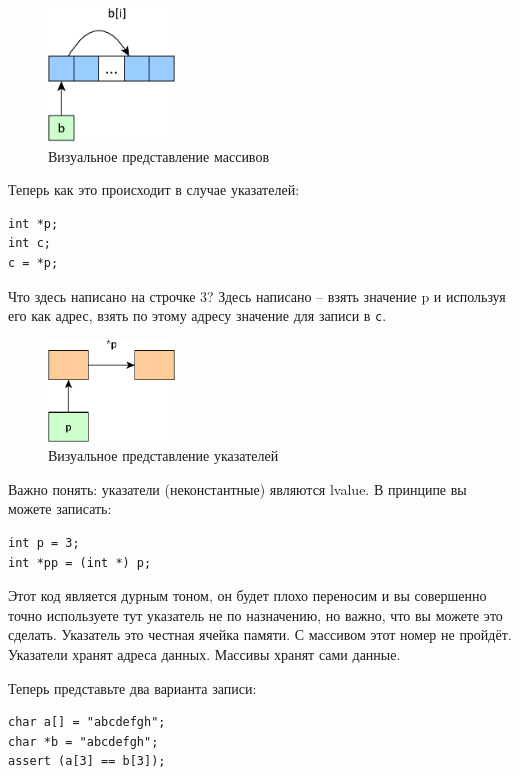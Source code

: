 \documentclass[a4paper,12pt,oneside]{article}
\begin{document}
\begin{figure}[h!]
\centering
\includegraphics[width=0.3\textwidth]{illustrations/arrays-crop.pdf}
\caption{Визуальное представление массивов}
\label{fig:arrays-crop}
\end{figure}

Теперь как это происходит в случае указателей:

\begin{lstlisting}
int *p;
int c;
c = *p;
\end{lstlisting}

Что здесь написано на строчке 3? Здесь написано – взять значение p и используя его как адрес, взять по этому адресу значение для записи в \lstinline!c!.

\begin{figure}[h!]
\centering
\includegraphics[width=0.3\textwidth]{illustrations/pointers-crop.pdf}
\caption{Визуальное представление указателей}
\label{fig:pointers-crop}
\end{figure}

Важно понять: указатели (неконстантные) являются lvalue. В принципе вы можете записать:

\begin{lstlisting}
int p = 3;
int *pp = (int *) p;
\end{lstlisting}

Этот код является дурным тоном, он будет плохо переносим и вы совершенно точно используете тут указатель не по назначению, но важно, что вы можете это сделать. Указатель это честная ячейка памяти. С массивом этот номер не пройдёт. Указатели хранят адреса данных. Массивы хранят сами данные.

Теперь представьте два варианта записи:

\begin{lstlisting}
char a[] = "abcdefgh";
char *b = "abcdefgh";
assert (a[3] == b[3]);
\end{lstlisting}
\end{document}
